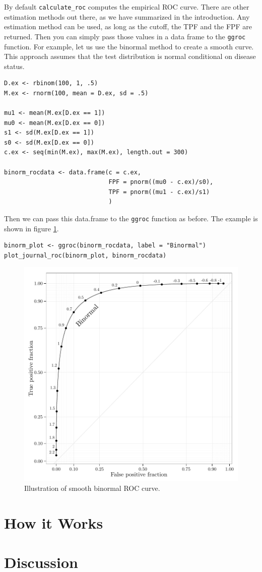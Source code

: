 \documentclass[article]{jss}
\begin{document}
By default \texttt{calculate\_roc} computes the empirical ROC curve.
There are other estimation methods out there, as we have summarized in
the introduction. Any estimation method can be used, as long as the
cutoff, the TPF and the FPF are returned. Then you can simply pass those
values in a data frame to the \texttt{ggroc} function. For example, let
us use the binormal method to create a smooth curve. This approach
assumes that the test distribution is normal conditional on disease
status.

\begin{verbatim}
D.ex <- rbinom(100, 1, .5)
M.ex <- rnorm(100, mean = D.ex, sd = .5)

mu1 <- mean(M.ex[D.ex == 1])
mu0 <- mean(M.ex[D.ex == 0])
s1 <- sd(M.ex[D.ex == 1])
s0 <- sd(M.ex[D.ex == 0])
c.ex <- seq(min(M.ex), max(M.ex), length.out = 300)

binorm_rocdata <- data.frame(c = c.ex, 
                             FPF = pnorm((mu0 - c.ex)/s0), 
                             TPF = pnorm((mu1 - c.ex)/s1)
                             )
\end{verbatim}

Then we can pass this data.frame to the \texttt{ggroc} function as
before. The example is shown in figure \ref{binorm}.

\begin{verbatim}
binorm_plot <- ggroc(binorm_rocdata, label = "Binormal")
plot_journal_roc(binorm_plot, binorm_rocdata)
\end{verbatim}

\begin{figure}[htbp]
\centering
\includegraphics{figure/binormal-1.pdf}
\caption{Illustration of smooth binormal ROC curve. \label{binorm}}
\end{figure}

\section{How it Works}\label{how-it-works}

\section{Discussion}\label{discussion}


%

\end{document}
